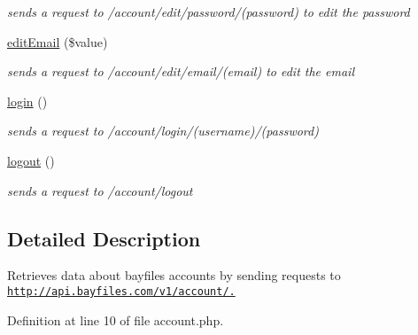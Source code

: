 \begin{DoxyCompactItemize}
\begin{DoxyCompactList}\small\item\em sends a request to /account/edit/password/(password) to edit the password \end{DoxyCompactList}\item 
\hypertarget{classAccount_ad20b13631f56caa944b0791b4a0f648c}{
\hyperlink{classAccount_ad20b13631f56caa944b0791b4a0f648c}{editEmail} (\$value)}
\label{classAccount_ad20b13631f56caa944b0791b4a0f648c}

\begin{DoxyCompactList}\small\item\em sends a request to /account/edit/email/(email) to edit the email \end{DoxyCompactList}\item 
\hypertarget{classAccount_a1dee4bb90b333fe6628d7898f8b50972}{
\hyperlink{classAccount_a1dee4bb90b333fe6628d7898f8b50972}{login} ()}
\label{classAccount_a1dee4bb90b333fe6628d7898f8b50972}

\begin{DoxyCompactList}\small\item\em sends a request to /account/login/(username)/(password) \end{DoxyCompactList}\item 
\hypertarget{classAccount_a14df93ec30cd4bd0d7f3df839ce6e4d5}{
\hyperlink{classAccount_a14df93ec30cd4bd0d7f3df839ce6e4d5}{logout} ()}
\label{classAccount_a14df93ec30cd4bd0d7f3df839ce6e4d5}

\begin{DoxyCompactList}\small\item\em sends a request to /account/logout \end{DoxyCompactList}\end{DoxyCompactItemize}


\subsection{Detailed Description}
Retrieves data about bayfiles accounts by sending requests to \href{http://api.bayfiles.com/v1/account/.}{\tt http://api.bayfiles.com/v1/account/.} 

Definition at line 10 of file account.php.



